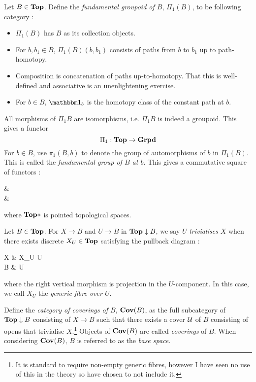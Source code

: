 \documentclass[./main.tex]{subfiles}
\begin{document}
\begin{dfn}

  Let $B \in \mathbf{Top}$.
  Define the \emph{fundamental groupoid of $B$}, $\Pi_1(B)$, to be 
  following category : 
  \begin{itemize}
    \item $\Pi_1(B)$ has $B$ as its collection objects.
    \item For $b, b_1 \in B$,
    $\Pi_1(B)(b,b_1)$ consists of paths from $b$ to $b_1$ 
    up to path-homotopy. 
    \item Composition is concatenation of paths up-to-homotopy.
    That this is well-defined and associative is an unenlightening exercise.
    \item For $b \in B$, $\id{b}$ is the homotopy class of the 
    constant path at $b$.
  \end{itemize}
  All morphisms of $\Pi_1 B$ are isomorphisms,
  i.e. $\Pi_1 B$ is indeed a groupoid.
  This gives a functor 
  \[
    \Pi_1 : \mathbf{Top} \to \mathbf{Grpd}
  \]
  For $b \in B$, use $\pi_1(B,b)$ to denote the 
  group of automorphisms of $b$ in $\Pi_1(B)$.
  This is called the \emph{fundamental group of $B$ at $b$}.
  This gives a commutative square of functors : 
  \begin{cd}
    \TOP* \ar[r,"\pi_1"] \ar[d]
      & \GRP \ar[d] \\
    \TOP \ar[r,"\Pi_1"]
      & 
  \end{cd}
  where $\mathbf{Top}*$ is pointed topological spaces.
\end{dfn}

\begin{dfn}[Covering]

  Let $B \in \mathbf{Top}$.
  For $X \to B$ and $U \to B$ in $\mathbf{Top}\downarrow B$,
  we say $U$ \emph{trivialises $X$} when 
  there exists discrete $X_U \in \mathbf{Top}$ satisfying the pullback diagram : 
  \begin{cd}
    X \ar[d]
      & X_U \times U \ar[d] \ar[l] \\
    B 
      & U \ar[l,"\sups"]
  \end{cd}
  where the right vertical morphism is projection in the $U$-component.
  In this case, we call $X_U$ the \emph{generic fibre over $U$}.

  Define the \emph{category of coverings of $B$}, $\mathbf{Cov}(B)$, as 
  the full subcategory of $\mathbf{Top}\downarrow B$ consisting of 
  $X \to B$ such that there exists a cover $\mathcal{U}$ of $B$
  consisting of opens that trivialise $X$.\footnote{
    It is standard to require non-empty generic fibres,
    however I have seen no use of this in the theory so 
    have chosen to not include it. 
  }
  Objects of $\mathbf{Cov}(B)$ are called \emph{coverings} of $B$.
  When considering $\mathbf{Cov}(B)$,
  $B$ is referred to as the \emph{base space}.
  
\end{dfn}
\end{document}
